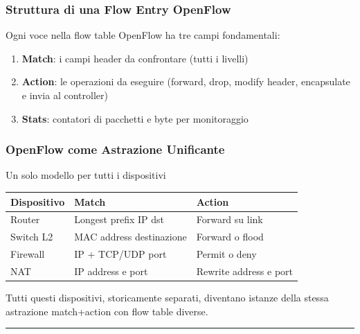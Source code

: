 \documentclass[
  italian,
  openany]{book}
\newcounter{none} %
\providecommand{\tightlist}{%
  \setlength{\itemsep}{0pt}\setlength{\parskip}{0pt}}
\begin{document}
\subsubsection{Struttura di una Flow Entry
OpenFlow}\label{struttura-di-una-flow-entry-openflow}

Ogni voce nella flow table OpenFlow ha tre campi fondamentali:

\begin{enumerate}
\def\labelenumi{\arabic{enumi}.}
\tightlist
\item
  \textbf{Match}: i campi header da confrontare (tutti i livelli)
\item
  \textbf{Action}: le operazioni da eseguire (forward, drop, modify
  header, encapsulate e invia al controller)
\item
  \textbf{Stats}: contatori di pacchetti e byte per monitoraggio
\end{enumerate}

\subsubsection{OpenFlow come Astrazione
Unificante}\label{openflow-come-astrazione-unificante}

\begin{callouttip}{Un solo modello per tutti i dispositivi}

{\def\LTcaptype{none} %
\begin{longtable}[]{@{}lll@{}}
\toprule\noalign{}
Dispositivo & Match & Action \\
\midrule\noalign{}
\endhead
\bottomrule\noalign{}
\endlastfoot
Router & Longest prefix IP dst & Forward su link \\
Switch L2 & MAC address destinazione & Forward o flood \\
Firewall & IP + TCP/UDP port & Permit o deny \\
NAT & IP address e port & Rewrite address e port \\
\end{longtable}
}

Tutti questi dispositivi, storicamente separati, diventano istanze della
stessa astrazione match+action con flow table diverse.

\end{callouttip}

\begin{center}\rule{0.5\linewidth}{0.5pt}\end{center}
\end{document}
